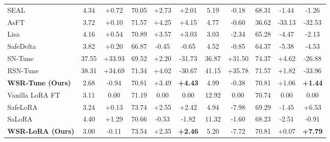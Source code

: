 \documentclass{article}
\begin{document}
\begin{table}[t]
{\begin{tabular}{lccccc|ccccc}
SEAL
& 4.34 & +0.72 & 70.05 & +2.73 & +2.01
& 5.19 & -0.18 & 68.31 & -1.44 & -1.26 \\

AsFT
& 3.72 & +0.10 & 71.57 & +4.25 & +4.15
& 4.77 & -0.60 & 36.62 & -33.13 & -32.53 \\

Lisa
& 4.16 & +0.54 & 70.89 & +3.57 & +3.03
& 3.03 & -2.34 & 65.28 & -4.47 & -2.13 \\

SafeDelta
& 3.82 & +0.20 & 66.87 & -0.45 & -0.65
& 4.52 & -0.85 & 64.37 & -5.38 & -4.53 \\

SN-Tune
& 37.55 & +33.93 & 69.52 & +2.20 & -31.73
& 36.87 & +31.50 & 74.37 & +4.62 & -26.88 \\

RSN-Tune
& 38.31 & +34.69 & 71.34 & +4.02 & -30.67
& 41.15 & +35.78 & 71.57 & +1.82 & -33.96 \\

\textbf{WSR-Tune (Ours)}
& 2.68 & -0.94 & 70.81 & +3.49 & \cellcolor{green!20}\textbf{+4.43}
& 4.99 & -0.38 & 70.81 & +1.06 & \cellcolor{green!20}\textbf{+1.44} \\

\midrule

Vanilla LoRA FT
& 3.11 & 0.00 & 71.19 & 0.00 & 0.00
& 12.92 & 0.00 & 70.74 & 0.00 & 0.00 \\

SafeLoRA
& 3.24 & +0.13 & 73.74 & +2.55 & +2.42
& 4.94 & -7.98 & 69.29 & -1.45 & +6.53 \\

SaLoRA
& 4.40 & +1.29 & 70.66 & -0.53 & -1.82
& 11.32 & -1.60 & 68.23 & -2.51 & -0.91 \\

\textbf{WSR-LoRA (Ours)}
& 3.00 & -0.11 & 73.54 & +2.35 & \cellcolor{green!20}\textbf{+2.46}
& 5.20 & -7.72 & 70.81 & +0.07 & \cellcolor{green!20}\textbf{+7.79} \\

\bottomrule
\end{tabular}
}

\vspace{1.0em}

\end{table}
\end{document}
